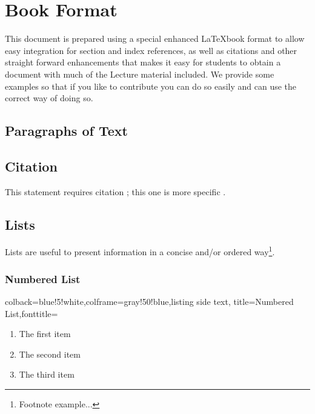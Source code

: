 

\chapter{Book Format}

\FILENAME

This document is prepared using a special enhanced \LaTeX book format to allow
easy integration for section and index references, as well as
citations and other straight forward enhancements that makes it easy
for students to obtain a document with much of the Lecture material
included. We provide some examples so that if you like to contribute
you can do so easily and can use the correct way of doing so.


\section{Paragraphs of Text}

\lipsum[1] %


\section{Citation}

This statement requires citation \cite{article_key}; this one is more specific \cite[162]{book_key}.


\section{Lists}

Lists are useful to present information in a concise and/or ordered way\footnote{Footnote example...}.

\subsection{Numbered List}

\begin{tcblisting}{colback=blue!5!white,colframe=gray!50!blue,listing side text,
  title=Numbered List,fonttitle=\bfseries}
\begin{enumerate}
\item The first item
\item The second item
\item The third item
\end{enumerate}
\end{tcblisting}

